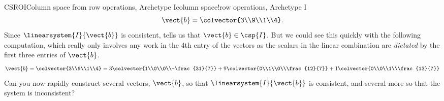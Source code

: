 \begin{example}{CSROI}{Column space from row operations, Archetype I}{column space!row operations, Archetype I}
%
\begin{equation*}
\vect{b}=\colvector{3\\9\\1\\4}.
\end{equation*}
%
Since $\linearsystem{I}{\vect{b}}$ is consistent,  tells us that $\vect{b}\in\csp{I}$.  But we could see this quickly with the following computation, which really only involves any work in the 4th entry of the vectors as the scalars in the linear combination are {\em dictated} by the first three entries of $\vect{b}$.
%
\begin{equation*}
\vect{b}=\colvector{3\\9\\1\\4}=
3\colvector{1\\0\\0\\-\frac{31}{7}}+
9\colvector{0\\1\\0\\\frac{12}{7}}+
1\colvector{0\\0\\1\\\frac{13}{7}}
\end{equation*}
%
Can you now rapidly construct several vectors, $\vect{b}$, so that $\linearsystem{I}{\vect{b}}$ is consistent, and several more so that the system is inconsistent?
%
\end{example}
%
%
